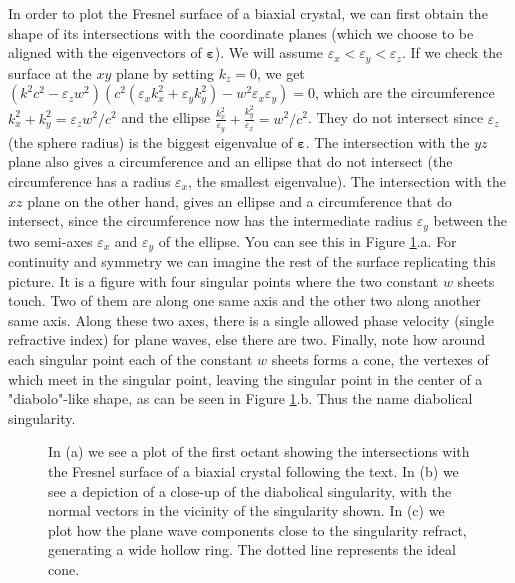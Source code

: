 \documentclass[11pt, a4paper, twoside]{article} %
\begin{document}
In order to plot the Fresnel surface of a biaxial crystal, we can first obtain the shape of its intersections with the coordinate planes (which we choose to be aligned with the eigenvectors of $\pmb{\varepsilon}$). We will assume $\varepsilon_x<\varepsilon_y<\varepsilon_z$. If we check the surface at the $xy$ plane by setting $k_z=0$, we get $(k^2c^2-\varepsilon_zw^2)(c^2(\varepsilon_xk_x^2+\varepsilon_yk_y^2)-w^2\varepsilon_x\varepsilon_y)=0$, which are the circumference $k_x^2+k_y^2=\varepsilon_zw^2/c^2$ and the ellipse $\frac{k_x^2}{\varepsilon_y}+\frac{k_y^2}{\varepsilon_x}=w^2/c^2$. They do not intersect since $\varepsilon_z$ (the sphere radius) is the biggest eigenvalue of $\pmb{\varepsilon}$. The intersection with the $yz$ plane also gives a circumference and an ellipse that do not intersect (the circumference has a radius $\varepsilon_x$, the smallest eigenvalue). The intersection with the $xz$ plane on the other hand, gives an ellipse and a circumference that do intersect, since the circumference now has the intermediate radius $\varepsilon_y$ between the two semi-axes $\varepsilon_x$ and $\varepsilon_y$ of the ellipse. You can see this in Figure \ref{fig:concentric2}.a. For continuity and symmetry we can imagine the rest of the surface replicating this picture. It is a figure with four singular points where the two constant $w$ sheets touch. Two of them are along one same axis and the other two along another same axis. Along these two axes, there is a single allowed phase velocity (single refractive index) for plane waves, else there are two. Finally, note how around each singular point each of the constant $w$ sheets forms a cone, the vertexes of which meet in the singular point, leaving the singular point in the center of a "diabolo"-like shape, as can be seen in Figure \ref{fig:concentric2}.b. Thus the name diabolical singularity.

\begin{figure}[h!] 
     \centering 
    \begin{subfigure}[b]{0.32\linewidth}
     \end{subfigure}
 \begin{subfigure}[b]{0.33\linewidth}
     \end{subfigure}
 \begin{subfigure}[b]{0.32\linewidth}
     \end{subfigure}
    \caption{In (a) we see a plot of the first octant showing the intersections with the Fresnel surface of a biaxial crystal following the text. In (b) we see a depiction of a close-up of the diabolical singularity, with the normal vectors in the vicinity of the singularity shown. In (c) we plot how the plane wave components close to the singularity refract, generating a wide hollow ring. The dotted line represents the ideal cone.}
    \label{fig:concentric2}
\end{figure}
\end{document}

